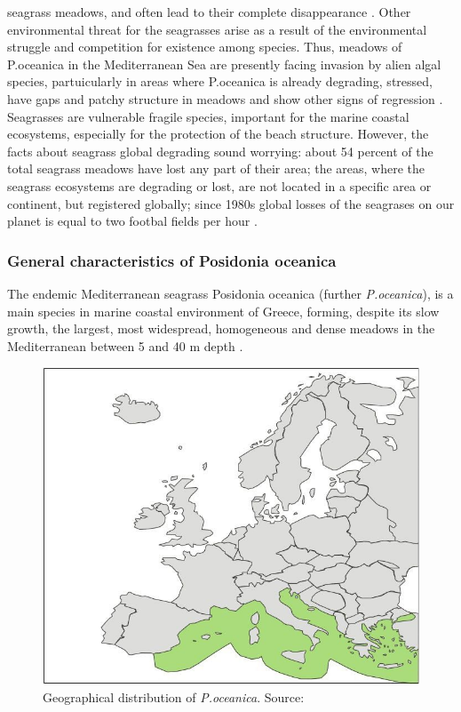 \documentclass[10pt, a4paper]{article}
\begin{document}
seagrass meadows, and often lead to their complete disappearance \cite{Holmer09}\label{Holmer09}.
Other environmental threat for the seagrasses arise as a result of the environmental struggle and
competition for existence among species. Thus, meadows of P.oceanica in the Mediterranean Sea are
presently facing invasion by alien algal species, partuicularly in areas where P.oceanica is already
degrading, stressed, have gaps and patchy structure in meadows and show other signs of regression
\cite{Montefalcone10}\label{Montefalcone10}.
Seagrasses are vulnerable fragile species, important for the marine coastal ecosystems, especially for
the protection of the beach structure. However, the facts about seagrass global degrading sound
worrying: about 54 percent of the total seagrass meadows have lost any part of their area; the areas, where
the seagrass ecosystems are degrading or lost, are not located in a specific area or continent, but
registered globally; since 1980s global losses of the seagrases on our planet is equal to two footbal
fields per hour \cite{Mellors09b}\label{Mellors09b}.

\subsubsection{General characteristics of Posidonia oceanica}
The endemic Mediterranean seagrass Posidonia oceanica (further \textit{P.oceanica}), is a main species in
marine coastal environment of Greece, forming, despite its slow growth, the largest, most widespread,
homogeneous and dense meadows in the Mediterranean between 5 and 40 m depth \cite{DenHartog70}\label{DenHartog70}.

\begin{figure}
	\centering
	\includegraphics[scale=0.20]{Fig-1-5.jpg}
	\caption{Geographical distribution of
	\textit{P.oceanica}. Source: \cite{Borum04}\label{Borum04}}
	\label{fig:5}
\end{figure}
\end{document}

